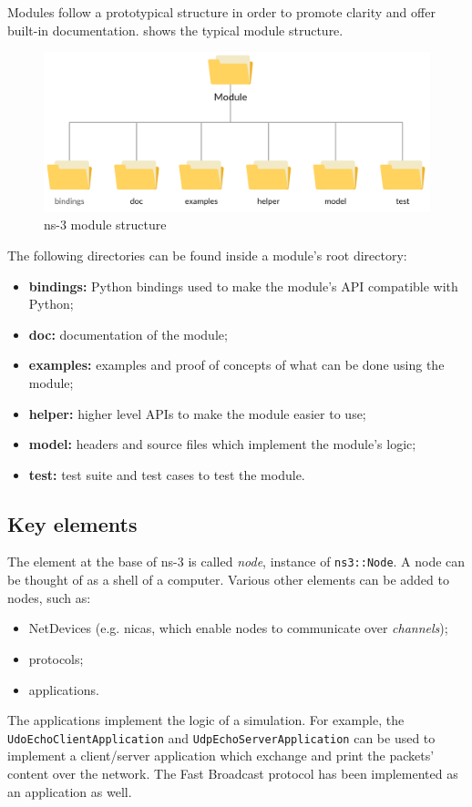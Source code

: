 	
	Modules follow a prototypical structure in order to promote clarity and offer built-in documentation.  shows the typical module structure.
	
	\begin{figure}[H]
		\centering
		\includegraphics[width=\textwidth]{immagini/ns-3-module}
		\caption{ns-3 module structure}
		\label{fig:ns-3-module}
	\end{figure}
	
	The following directories can be found inside a module's root directory:
	\begin{itemize}
		\item \textbf{bindings:} Python bindings used to make the module's API compatible with Python;
		\item \textbf{doc:} documentation of the module;
		\item \textbf{examples:} examples and proof of concepts of what can be done using the module;
		\item \textbf{helper:} higher level APIs to make the module easier to use;
		\item \textbf{model:} headers and source files which implement the module's logic; 
		\item \textbf{test:} test suite and test cases to test the module.
	\end{itemize}
	
	\subsection{Key elements}
	The element at the base of ns-3 is called \textit{node}, instance of \texttt{ns3::Node}. A node can be thought of as a shell of a computer. Various other elements can be added to nodes, such as:
	\begin{itemize}
		\item NetDevices (e.g. \acrshort{nica}s, which enable nodes to communicate over \textit{channels});
		\item protocols;
		\item applications. 
	\end{itemize}
	The applications implement the logic of a simulation. For example, the \texttt{UdoEchoClientApplication} and \texttt{UdpEchoServerApplication} can be used to implement a client/server application which exchange and print the packets' content over the network. The Fast Broadcast protocol has been implemented as an application as well.
	
